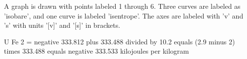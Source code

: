 A graph is drawn with points labeled 1 through 6. Three curves are labeled as 'isobare', and one curve is labeled 'isentrope'. The axes are labeled with 'v' and 's' with units '[v]' and '[s]' in brackets.

U Fe 2 = negative 333.812 plus 333.488 divided by 10.2 equals (2.9 minus 2) times 333.488 equals negative 333.533 kilojoules per kilogram